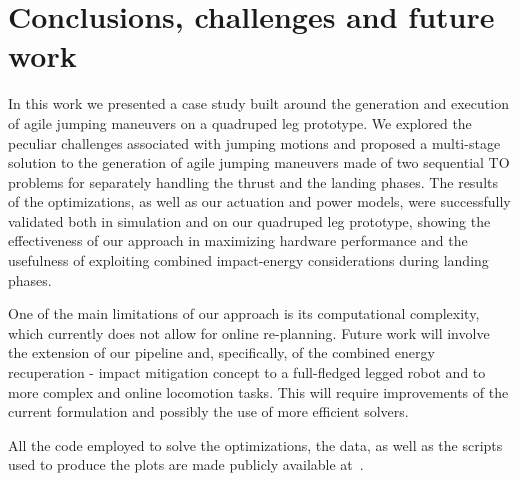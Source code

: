 \section{Conclusions, challenges and future work}\label{sec:conclusions}
In this work we presented a case study built around the generation and execution of agile jumping maneuvers on a quadruped leg prototype.  
We 
explored the peculiar challenges associated with jumping motions and 
proposed a multi-stage solution 
to the generation of agile jumping maneuvers 
made of two sequential TO problems for separately handling the thrust 
and the landing phases.
The results of the optimizations, as well as our actuation and power models, were successfully validated both in simulation and on our quadruped leg prototype, showing the effectiveness of our approach in maximizing hardware performance and the usefulness of exploiting combined impact-energy considerations during landing phases.

One of the main limitations of our approach is its computational complexity, which currently does not allow for online re-planning. Future work will involve the extension of our pipeline and, specifically, of the combined energy recuperation - impact mitigation concept to a full-fledged legged robot and to more complex and online locomotion tasks. This will require improvements of the current formulation and possibly the use of more efficient solvers.  

All the code employed to solve the optimizations, the  data, as well as the scripts used to produce the plots are made publicly available at~\cite{url::awesome_leg_repo}.